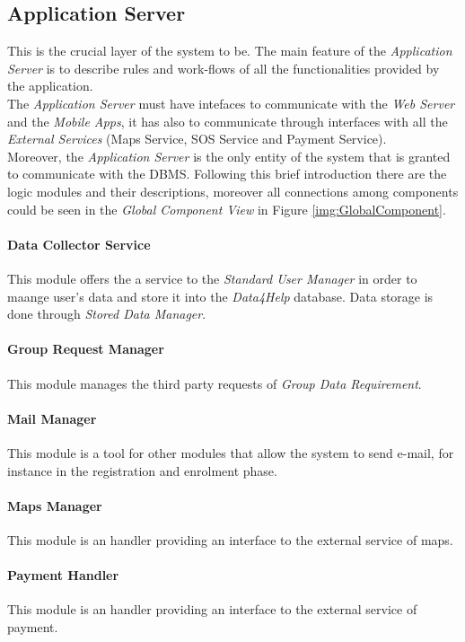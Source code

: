 \subsection{Application Server}
This is the crucial layer of the system to be. The main feature of the \textit{Application Server} is to describe rules and work-flows of all the functionalities provided by the application.\\
The \textit{Application Server} must have intefaces to communicate with the \textit{Web Server} and the \textit{Mobile Apps}, it has also to communicate through interfaces with all the \textit{External Services} (Maps Service, SOS Service and Payment Service).\\
Moreover, the \textit{Application Server} is the only entity of the system that is granted to communicate with the DBMS.
Following this brief introduction there are the logic modules and their descriptions, moreover all connections among components could be seen in the \textit{Global Component View} in Figure \ref{img:GlobalComponent}.

\paragraph{Data Collector Service}
This module offers the a service to the \textit{Standard User Manager} in order to maange user's data and store it into the \textit{Data4Help} database. Data storage is done through \textit{Stored Data Manager}.

\paragraph{Group Request Manager}
This module manages the third party requests of \textit{Group Data Requirement}.

\paragraph{Mail Manager}
This module is a tool for other modules that allow the system to send e-mail, for instance in the registration and enrolment phase.

\paragraph{Maps Manager}
This module is an handler providing an interface to the external service of maps.

\paragraph{Payment Handler}
This module is an handler providing an interface to the external service of payment.

